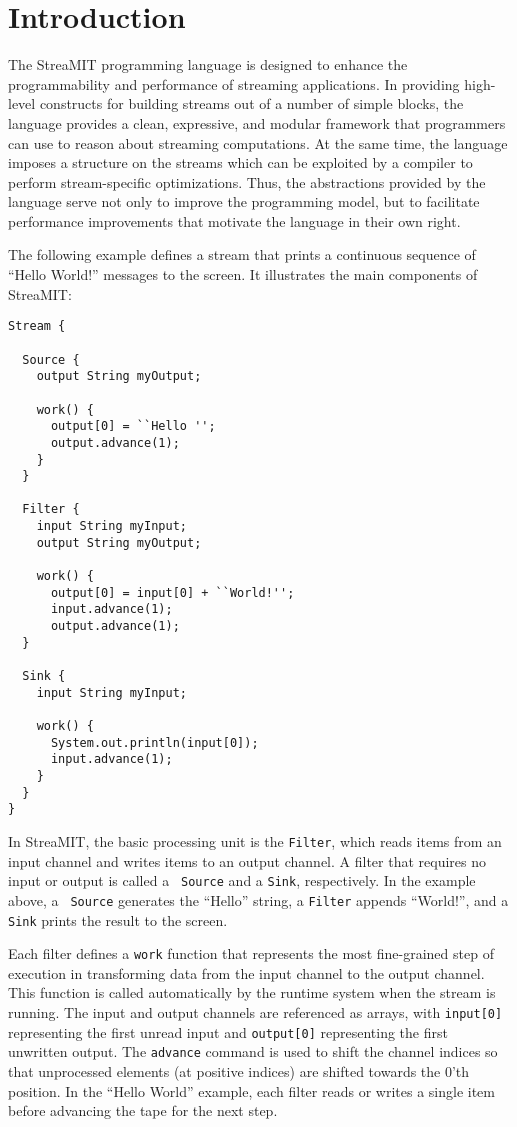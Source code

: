 \documentclass[draft]{article}
\begin{document}
\section{Introduction}
\label{sec:intro}

The StreaMIT programming language is designed to enhance the
programmability and performance of streaming applications.  In
providing high-level constructs for building streams out of a number
of simple blocks, the language provides a clean, expressive, and
modular framework that programmers can use to reason about streaming
computations.  At the same time, the language imposes a structure on
the streams which can be exploited by a compiler to perform
stream-specific optimizations.  Thus, the abstractions provided by the
language serve not only to improve the programming model, but to
facilitate performance improvements that motivate the language in
their own right.

The following example defines a stream that prints a continuous
sequence of ``Hello World!'' messages to the screen.  It illustrates
the main components of StreaMIT:

\begin{verbatim}
Stream {

  Source {
    output String myOutput;

    work() {
      output[0] = ``Hello '';
      output.advance(1);
    }
  }

  Filter {
    input String myInput;
    output String myOutput;

    work() {
      output[0] = input[0] + ``World!'';
      input.advance(1);
      output.advance(1);
  }

  Sink {
    input String myInput;
    
    work() {
      System.out.println(input[0]);
      input.advance(1);
    }
  }
}
\end{verbatim}

In StreaMIT, the basic processing unit is the {\tt Filter}, which
reads items from an input channel and writes items to an output
channel.  A filter that requires no input or output is called a {\tt
Source} and a {\tt Sink}, respectively.  In the example above, a {\tt
Source} generates the ``Hello'' string, a {\tt Filter} appends
``World!'', and a {\tt Sink} prints the result to the screen.

Each filter defines a {\tt work} function that represents the most
fine-grained step of execution in transforming data from the input
channel to the output channel.  This function is called automatically
by the runtime system when the stream is running.  The input and
output channels are referenced as arrays, with {\tt input[0]}
representing the first unread input and {\tt output[0]} representing
the first unwritten output.  The {\tt advance} command is used to
shift the channel indices so that unprocessed elements (at positive
indices) are shifted towards the 0'th position.  In the ``Hello
World'' example, each filter reads or writes a single item before
advancing the tape for the next step.
\end{document}
